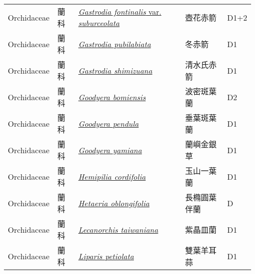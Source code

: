 {\begin{longtable}{p{2.5cm}p{2cm}p{5cm}p{2.5cm}p{3cm}}
    Orchidaceae & 蘭科 & \href{http://www.theplantlist.org/tpl1.1/search?q=Gastrodia+fontinalis+var.+suburceolata}{\textit{Gastrodia fontinalis} var. \textit{suburceolata} } & 壺花赤箭 & D1+2 \index{Gastrodia@\textit{Gastrodia}!fontinalis@\textit{fontinalis}!var. suburceolata@var. \textit{suburceolata}}  \index{壺花赤箭} \\
    Orchidaceae & 蘭科 & \href{http://www.theplantlist.org/tpl1.1/search?q=Gastrodia+pubilabiata}{\textit{Gastrodia pubilabiata} } & 冬赤箭 & D1 \index{Gastrodia@\textit{Gastrodia}!pubilabiata@\textit{pubilabiata}}  \index{冬赤箭} \\
    Orchidaceae & 蘭科 & \href{http://www.theplantlist.org/tpl1.1/search?q=Gastrodia+shimizuana}{\textit{Gastrodia shimizuana} } & 清水氏赤箭 & D1 \index{Gastrodia@\textit{Gastrodia}!shimizuana@\textit{shimizuana}}  \index{清水氏赤箭} \\
    Orchidaceae & 蘭科 & \href{http://www.theplantlist.org/tpl1.1/search?q=Goodyera+bomiensis}{\textit{Goodyera bomiensis} } & 波密斑葉蘭 & D2 \index{Goodyera@\textit{Goodyera}!bomiensis@\textit{bomiensis}}  \index{波密斑葉蘭} \\
    Orchidaceae & 蘭科 & \href{http://www.theplantlist.org/tpl1.1/search?q=Goodyera+pendula}{\textit{Goodyera pendula} } & 垂葉斑葉蘭 & D1 \index{Goodyera@\textit{Goodyera}!pendula@\textit{pendula}}  \index{垂葉斑葉蘭} \\
    Orchidaceae & 蘭科 & \href{http://www.theplantlist.org/tpl1.1/search?q=Goodyera+yamiana}{\textit{Goodyera yamiana} } & 蘭嶼金銀草 & D1 \index{Goodyera@\textit{Goodyera}!yamiana@\textit{yamiana}}  \index{蘭嶼金銀草} \\
    Orchidaceae & 蘭科 & \href{http://www.theplantlist.org/tpl1.1/search?q=Hemipilia+cordifolia}{\textit{Hemipilia cordifolia} } & 玉山一葉蘭 & D1 \index{Hemipilia@\textit{Hemipilia}!cordifolia@\textit{cordifolia}}  \index{玉山一葉蘭} \\
    Orchidaceae & 蘭科 & \href{http://www.theplantlist.org/tpl1.1/search?q=Hetaeria+oblongifolia}{\textit{Hetaeria oblongifolia} } & 長橢圓葉伴蘭 & D \index{Hetaeria@\textit{Hetaeria}!oblongifolia@\textit{oblongifolia}}  \index{長橢圓葉伴蘭} \\
    Orchidaceae & 蘭科 & \href{http://www.theplantlist.org/tpl1.1/search?q=Lecanorchis+taiwaniana}{\textit{Lecanorchis taiwaniana} } & 紫晶皿蘭 & D1 \index{Lecanorchis@\textit{Lecanorchis}!taiwaniana@\textit{taiwaniana}}  \index{紫晶皿蘭} \\
    Orchidaceae & 蘭科 & \href{http://www.theplantlist.org/tpl1.1/search?q=Liparis+petiolata}{\textit{Liparis petiolata} } & 雙葉羊耳蒜 & D1 \index{Liparis@\textit{Liparis}!petiolata@\textit{petiolata}}  \index{雙葉羊耳蒜} \\

\end{longtable}}
